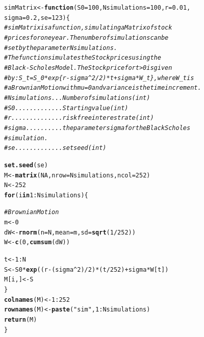 \documentclass[10pt,a4paper]{report}\usepackage[]{graphicx}\usepackage[]{color}
\makeatletter
\newcommand{\hlnum}[1]{\textcolor[rgb]{0.686,0.059,0.569}{#1}}%
\newcommand{\hlstr}[1]{\textcolor[rgb]{0.192,0.494,0.8}{#1}}%
\newcommand{\hlcom}[1]{\textcolor[rgb]{0.678,0.584,0.686}{\textit{#1}}}%
\newcommand{\hlopt}[1]{\textcolor[rgb]{0,0,0}{#1}}%
\newcommand{\hlstd}[1]{\textcolor[rgb]{0.345,0.345,0.345}{#1}}%
\newcommand{\hlkwa}[1]{\textcolor[rgb]{0.161,0.373,0.58}{\textbf{#1}}}%
\newcommand{\hlkwb}[1]{\textcolor[rgb]{0.69,0.353,0.396}{#1}}%
\newcommand{\hlkwc}[1]{\textcolor[rgb]{0.333,0.667,0.333}{#1}}%
\newcommand{\hlkwd}[1]{\textcolor[rgb]{0.737,0.353,0.396}{\textbf{#1}}}%
\newenvironment{kframe}{%
 \def\at@end@of@kframe{}%
 \ifinner\ifhmode%
  \def\at@end@of@kframe{\end{minipage}}%
  \begin{minipage}{\columnwidth}%
 \fi\fi%
 \def\FrameCommand##1{\hskip\@totalleftmargin \hskip-\fboxsep
 \colorbox{shadecolor}{##1}\hskip-\fboxsep
     \hskip-\linewidth \hskip-\@totalleftmargin \hskip\columnwidth}%
 \MakeFramed {\advance\hsize-\width
   \@totalleftmargin\z@ \linewidth\hsize
   \@setminipage}}%
 {\par\unskip\endMakeFramed%
 \at@end@of@kframe}
\makeatother
\begin{document}
\begin{kframe}
\begin{alltt}
\hlstd{simMatrix} \hlkwb{<-} \hlkwa{function}\hlstd{(}\hlkwc{S0}\hlstd{=}\hlnum{100}\hlstd{,} \hlkwc{Nsimulations}\hlstd{=}\hlnum{100}\hlstd{,} \hlkwc{r}\hlstd{=}\hlnum{0.01}\hlstd{,}
                      \hlkwc{sigma}\hlstd{=}\hlnum{0.2}\hlstd{,} \hlkwc{se}\hlstd{=}\hlnum{123}\hlstd{)\{}
  \hlcom{# simMatrix is a function, simulating a Matrix of stock}
  \hlcom{# prices for one year. The number of simulations can be}
  \hlcom{# set by the parameter Nsimulations. }
  \hlcom{# The function simulates the Stock prices using the }
  \hlcom{# Black-Scholes Model. The Stock price for t>0 is given}
  \hlcom{# by: S_t = S_0 * exp\{r-sigma^2/2)*t + sigma*W_t\}, where W_t is }
  \hlcom{# a Brownian Motion with mu=0 and variance is the time increment.}
  \hlcom{# Nsimulations ... Number of simulations (int)}
  \hlcom{# S0 ............. Starting value (int)}
  \hlcom{# r .............. risk free interest rate (int)}
  \hlcom{# sigma .......... the parameter sigma for the Black Scholes}
  \hlcom{#                  simulation. }
  \hlcom{# se ............. set seed (int)}

  \hlkwd{set.seed}\hlstd{(se)}
  \hlstd{M} \hlkwb{<-} \hlkwd{matrix}\hlstd{(}\hlnum{NA}\hlstd{,} \hlkwc{nrow}\hlstd{=Nsimulations,} \hlkwc{ncol}\hlstd{=}\hlnum{252}\hlstd{)}
  \hlstd{N} \hlkwb{<-} \hlnum{252}
  \hlkwa{for} \hlstd{(i} \hlkwa{in} \hlnum{1}\hlopt{:}\hlstd{Nsimulations)\{}

    \hlcom{# Brownian Motion}
    \hlstd{m} \hlkwb{<-} \hlnum{0}
    \hlstd{dW} \hlkwb{<-} \hlkwd{rnorm}\hlstd{(}\hlkwc{n}\hlstd{=N,} \hlkwc{mean}\hlstd{=m,} \hlkwc{sd}\hlstd{=}\hlkwd{sqrt}\hlstd{(}\hlnum{1}\hlopt{/}\hlnum{252}\hlstd{))}
    \hlstd{W} \hlkwb{<-} \hlkwd{c}\hlstd{(}\hlnum{0}\hlstd{,} \hlkwd{cumsum}\hlstd{(dW))}

    \hlstd{t} \hlkwb{<-} \hlnum{1}\hlopt{:}\hlstd{N}
    \hlstd{S} \hlkwb{<-} \hlstd{S0}\hlopt{*}\hlkwd{exp}\hlstd{((r}\hlopt{-}\hlstd{(sigma}\hlopt{^}\hlnum{2}\hlstd{)}\hlopt{/}\hlnum{2}\hlstd{)}\hlopt{*}\hlstd{(t}\hlopt{/}\hlnum{252}\hlstd{)}\hlopt{+}\hlstd{sigma}\hlopt{*}\hlstd{W[t])}
    \hlstd{M[i,]} \hlkwb{<-} \hlstd{S}
  \hlstd{\}}
  \hlkwd{colnames}\hlstd{(M)} \hlkwb{<-} \hlnum{1}\hlopt{:}\hlnum{252}
  \hlkwd{rownames}\hlstd{(M)} \hlkwb{<-} \hlkwd{paste}\hlstd{(}\hlstr{"sim"}\hlstd{,} \hlnum{1}\hlopt{:}\hlstd{Nsimulations)}
  \hlkwd{return}\hlstd{(M)}
\hlstd{\}}
\end{alltt}
\end{kframe}
\end{document}
